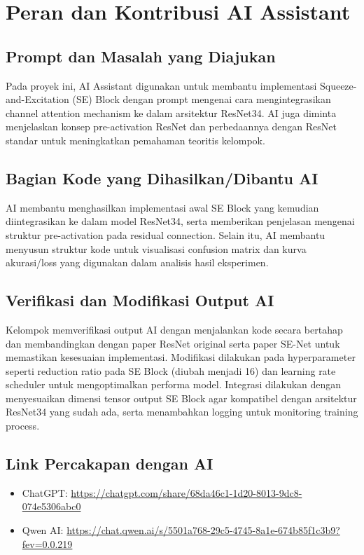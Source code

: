 \section{Peran dan Kontribusi AI Assistant}

\subsection{Prompt dan Masalah yang Diajukan}
Pada proyek ini, AI Assistant digunakan untuk membantu implementasi Squeeze-and-Excitation (SE) Block dengan prompt mengenai cara mengintegrasikan channel attention mechanism ke dalam arsitektur ResNet34. AI juga diminta menjelaskan konsep pre-activation ResNet dan perbedaannya dengan ResNet standar untuk meningkatkan pemahaman teoritis kelompok.

\subsection{Bagian Kode yang Dihasilkan/Dibantu AI}
AI membantu menghasilkan implementasi awal SE Block yang kemudian diintegrasikan ke dalam model ResNet34, serta memberikan penjelasan mengenai struktur pre-activation pada residual connection. Selain itu, AI membantu menyusun struktur kode untuk visualisasi confusion matrix dan kurva akurasi/loss yang digunakan dalam analisis hasil eksperimen.

\subsection{Verifikasi dan Modifikasi Output AI}
Kelompok memverifikasi output AI dengan menjalankan kode secara bertahap dan membandingkan dengan paper ResNet original serta paper SE-Net untuk memastikan kesesuaian implementasi. Modifikasi dilakukan pada hyperparameter seperti reduction ratio pada SE Block (diubah menjadi 16) dan learning rate scheduler untuk mengoptimalkan performa model. Integrasi dilakukan dengan menyesuaikan dimensi tensor output SE Block agar kompatibel dengan arsitektur ResNet34 yang sudah ada, serta menambahkan logging untuk monitoring training process.

\subsection{Link Percakapan dengan AI}
\begin{itemize}
    \item ChatGPT: \url{https://chatgpt.com/share/68da46c1-1d20-8013-9dc8-074e5306abc0}
    \item Qwen AI: \url{https://chat.qwen.ai/s/5501a768-29c5-4745-8a1e-674b85f1c3b9?fev=0.0.219}
\end{itemize}
